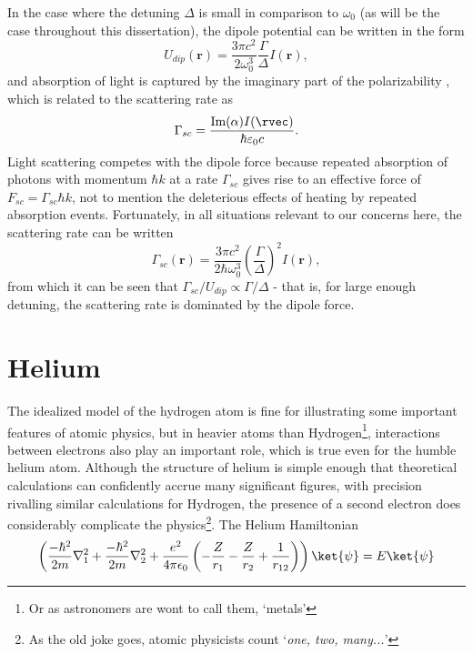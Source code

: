 	In the case where the detuning $\Delta$ is small in comparison to $\omega_0$ (as will be the case throughout this dissertation), the dipole potential can be written in the form \cite{Grimm00}
	\begin{equation}
		U_{dip}(\textbf{r}) = \frac{3\pi c^2}{2\omega_0^3}\frac{\Gamma}{\Delta}I(\textbf{r}),
	\end{equation}
	and absorption of light is captured by the imaginary part of the polarizability \cite{FootAtomic}, which is related to the scattering rate as
	\begin{equation}
		\Gamma_{sc} = \frac{\textrm{Im}(\alpha)I(\rvec)}{\hbar\varepsilon_0 c}.
	\end{equation}
	Light scattering competes with the dipole force because repeated absorption of photons with momentum $\hbar k$ at a rate $\Gamma_{sc}$ gives rise to an effective force of $F_{sc}=\Gamma_{sc}\hbar k$, not to mention the deleterious effects of heating by repeated absorption events.
	Fortunately, in all situations relevant to our concerns here, the scattering rate can be written 
	\begin{equation}
		\Gamma_{sc}(\textbf{r}) = \frac{3\pi c^2}{2\hbar\omega_0^3}\left(\frac{\Gamma}{\Delta}\right)^2 I(\textbf{r}),
	\end{equation}
	from which it can be seen that $\Gamma_{sc}/U_{dip} \propto \Gamma/\Delta$ - that is, for large enough detuning, the scattering rate is dominated by the dipole force.
	

		
\section{Helium} 

	The idealized model of the hydrogen atom is fine for illustrating some important features of atomic physics, but in heavier atoms than Hydrogen\footnote{Or as astronomers are wont to call them, `metals'}, interactions between electrons also play an important role, which is true even for the humble helium atom.
	Although the structure of helium is simple enough that theoretical calculations can confidently accrue many significant figures, with precision rivalling similar calculations for Hydrogen, the presence of a second electron does considerably complicate the physics\footnote{As the old joke goes, atomic physicists count `\emph{one, two, many...}'}.
	The Helium Hamiltonian 
	$$
	\left(\frac{-\hbar^2}{2m}\nabla_{1}^2+\frac{-\hbar^2}{2m}\nabla_{2}^2 + \frac{e^2}{4\pi\epsilon_0}\left(-\frac{Z}{r_1}-\frac{Z}{r_2}+\frac{1}{r_{12}}\right) \right)\ket{\psi} = E \ket{\psi}
	$$

